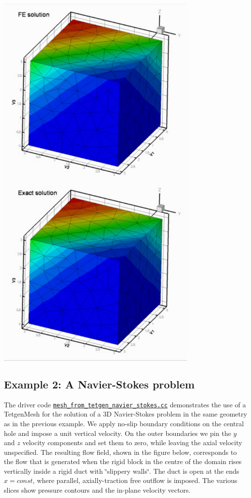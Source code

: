  
\begin{DoxyImage}
\includegraphics[width=0.75\textwidth]{compare_quadratic}
\end{DoxyImage}




 

\hypertarget{index_nst}{}\subsection{Example 2\+: A Navier-\/\+Stokes problem}\label{index_nst}
The driver code \href{../../../../demo_drivers/meshing/mesh_from_tetgen/mesh_from_tetgen_navier_stokes.cc}{\tt mesh\+\_\+from\+\_\+tetgen\+\_\+navier\+\_\+stokes.\+cc} demonstrates the use of a {\ttfamily Tetgen\+Mesh} for the solution of a 3D Navier-\/\+Stokes problem in the same geometry as in the previous example. We apply no-\/slip boundary conditions on the central hole and impose a unit vertical velocity. On the outer boundaries we pin the $ y $ and $ z $ velocity components and set them to zero, while leaving the axial velocity unspecified. The resulting flow field, shown in the figure below, corresponds to the flow that is generated when the rigid block in the centre of the domain rises vertically inside a rigid duct with \char`\"{}slippery walls\char`\"{}. The duct is open at the ends $ x=const$, where parallel, axially-\/traction free outflow is imposed. The various slices show pressure contours and the in-\/plane velocity vectors.

